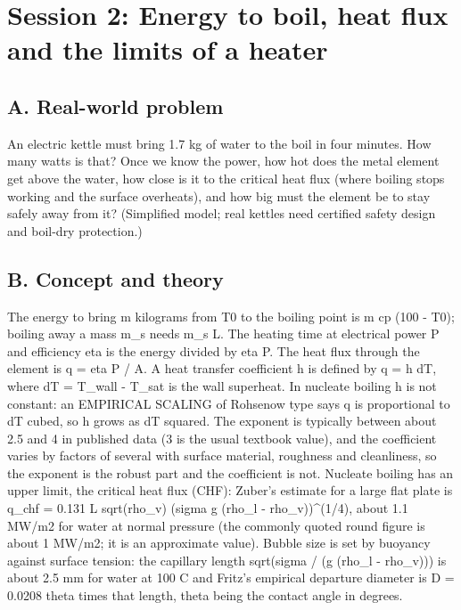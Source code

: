 \documentclass[11pt,a4paper]{article}
\begin{document}
\section{Session 2: Energy to boil, heat flux and the limits of a heater}

\subsection*{A. Real-world problem}
An electric kettle must bring 1.7 kg of water to the boil in four minutes. How many watts is that? Once we know the power, how hot does the metal element get above the water, how close is it to the critical heat flux (where boiling stops working and the surface overheats), and how big must the element be to stay safely away from it? (Simplified model; real kettles need certified safety design and boil-dry protection.)

\subsection*{B. Concept and theory}
The energy to bring m kilograms from T0 to the boiling point is m cp (100 - T0); boiling away a mass m\_s needs m\_s L. The heating time at electrical power P and efficiency eta is the energy divided by eta P. The heat flux through the element is q = eta P / A. A heat transfer coefficient h is defined by q = h dT, where dT = T\_wall - T\_sat is the wall superheat. In nucleate boiling h is not constant: an EMPIRICAL SCALING of Rohsenow type says q is proportional to dT cubed, so h grows as dT squared. The exponent is typically between about 2.5 and 4 in published data (3 is the usual textbook value), and the coefficient varies by factors of several with surface material, roughness and cleanliness, so the exponent is the robust part and the coefficient is not. Nucleate boiling has an upper limit, the critical heat flux (CHF): Zuber's estimate for a large flat plate is q\_chf = 0.131 L sqrt(rho\_v) (sigma g (rho\_l - rho\_v))\textasciicircum{}(1/4), about 1.1 MW/m2 for water at normal pressure (the commonly quoted round figure is about 1 MW/m2; it is an approximate value). Bubble size is set by buoyancy against surface tension: the capillary length sqrt(sigma / (g (rho\_l - rho\_v))) is about 2.5 mm for water at 100 C and Fritz's empirical departure diameter is D = 0.0208 theta times that length, theta being the contact angle in degrees.
\end{document}
